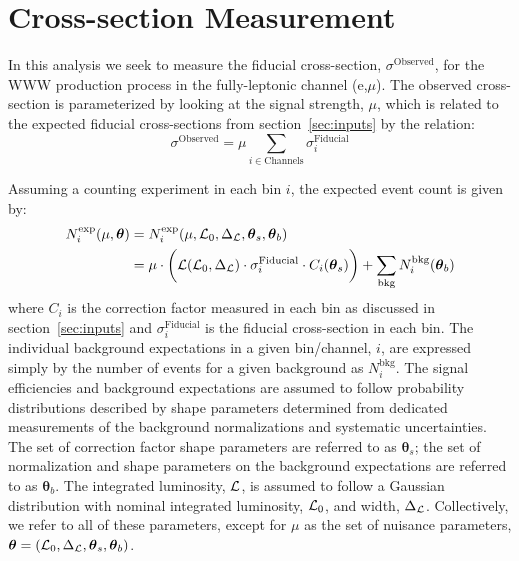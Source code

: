 

\section{Cross-section Measurement}
\label{sec:measurement}
\newcommand*\Diff[1]{\mathop{}\!\mathrm{d}#1~}
\newcommand{\boldtheta}{\boldsymbol{\theta}}
\newcommand{\thetas}{\boldsymbol{\theta}_s}
\newcommand{\thetab}{\boldsymbol{\theta}_b}

In this analysis we seek to measure the 
fiducial cross-section, $\sigma^{\textrm{Observed}}$, for the 
WWW production process in the fully-leptonic channel (e,$\mu$).
The observed cross-section is parameterized by looking at the signal
strength, $\mu$, which is related to the expected fiducial cross-sections
from section~\ref{sec:inputs} by the relation:
\begin{equation}
\sigma^{\textrm{Observed}} = \mu \sum_{i\in \textrm{Channels}} \sigma^{\textrm{Fiducial}}_i
\end{equation}

Assuming a counting experiment in each bin $i$, the expected 
event count is given by:
\begin{align}
N^{\mathrm{exp}}_i(\mu,\boldtheta) &= N^{\mathrm{exp}}_i(\mu,\curlyl_0,\Delta_{\curlyl},\thetas,\thetab) \\
 &= \mu \cdot \bigg( \curlyl(\curlyl_0,\Delta_{\curlyl}) \cdot \sigma^{\mathrm{Fiducial}}_i \cdot C_i(\thetas) \bigg) + \sum_{\mathrm{bkg}} N_{i}^{\mathrm{bkg}}(\thetab)
\label{eq:poisson_expectation}
\end{align}
where $C_i$ is the correction factor 
measured in each bin as discussed in section~\ref{sec:inputs} and 
$\sigma^{\mathrm{Fiducial}}_i$ is the fiducial cross-section in each 
bin. The 
individual background expectations in a given bin/channel, $i$, are 
expressed simply by the number of events
for a given background as $N^{\mathrm{bkg}}_i$. 
The signal efficiencies and background expectations are assumed to follow 
probability distributions described by shape parameters determined from 
dedicated measurements of the background normalizations and systematic 
uncertainties.  
The set of correction factor shape parameters are referred to 
as $\thetas$; the set of normalization and shape parameters on 
the background expectations are referred to as $\thetab$.
The integrated luminosity, $\mathcal{L}$, is assumed to follow 
a Gaussian distribution with nominal integrated 
luminosity, $\mathcal{L}_0$, and width, $\Delta_{\mathcal{L}}$. 
Collectively, we refer to all of these parameters, except 
for $\mu$ as the set of nuisance 
parameters, $\boldtheta = (\curlyl_0,\Delta_{\curlyl}, \thetas, \thetab)$. 

